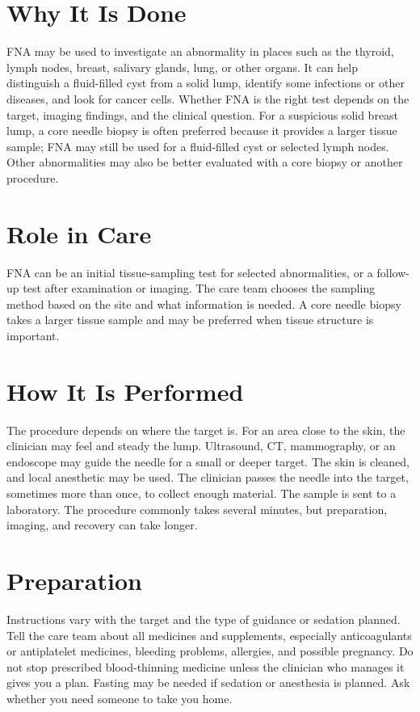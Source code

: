 \section*{Why It Is Done}
FNA may be used to investigate an abnormality in places such as the thyroid, lymph nodes, breast, salivary glands, lung, or other organs. It can help distinguish a fluid-filled cyst from a solid lump, identify some infections or other diseases, and look for cancer cells. Whether FNA is the right test depends on the target, imaging findings, and the clinical question. For a suspicious solid breast lump, a core needle biopsy is often preferred because it provides a larger tissue sample; FNA may still be used for a fluid-filled cyst or selected lymph nodes. Other abnormalities may also be better evaluated with a core biopsy or another procedure.

\section*{Role in Care}
FNA can be an initial tissue-sampling test for selected abnormalities, or a follow-up test after examination or imaging. The care team chooses the sampling method based on the site and what information is needed. A core needle biopsy takes a larger tissue sample and may be preferred when tissue structure is important.

\section*{How It Is Performed}
The procedure depends on where the target is. For an area close to the skin, the clinician may feel and steady the lump. Ultrasound, CT, mammography, or an endoscope may guide the needle for a small or deeper target. The skin is cleaned, and local anesthetic may be used. The clinician passes the needle into the target, sometimes more than once, to collect enough material. The sample is sent to a laboratory. The procedure commonly takes several minutes, but preparation, imaging, and recovery can take longer.

\section*{Preparation}
Instructions vary with the target and the type of guidance or sedation planned. Tell the care team about all medicines and supplements, especially anticoagulants or antiplatelet medicines, bleeding problems, allergies, and possible pregnancy. Do not stop prescribed blood-thinning medicine unless the clinician who manages it gives you a plan. Fasting may be needed if sedation or anesthesia is planned. Ask whether you need someone to take you home.

